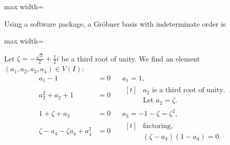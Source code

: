 \documentclass[11pt,oneside]{article}
\begin{document}
\begin{BookBody}
\begin{center}\begin{adjustbox}{max width=\linewidth}\end{adjustbox}\end{center}

\noindent Using a software package, a Gröbner basis with indeterminate order  is

\begin{center}\begin{adjustbox}{max width=\linewidth}\end{adjustbox}\end{center}

\noindent Let $\zeta=-\frac{\sqrt{3}}{2}+\frac{1}{2}i$ be a third root of unity. We find an element $(a_1,a_2,a_3,a_4)\in V(I)$:
\[
\begin{aligned}
a_1-1 &= 0 && a_1=1,\\
a_2^2+a_2+1 &= 0 && \begin{aligned}[t]
 &\text{$a_2$ is a third root of unity.}\\
 &\text{Let }a_2=\zeta.
 \end{aligned}\\
1+\zeta+a_3 &= 0 && a_3=-1-\zeta=\zeta^2,\\
\zeta-a_4-\zeta a_4+a_4^2 &= 0 && \begin{aligned}[t]
 &\text{factoring,}\\
 &(\zeta-a_4)(1-a_4)=0.
 \end{aligned}
\end{aligned}
\]

\end{BookBody}

\BookNarrativetrue
\end{document}
